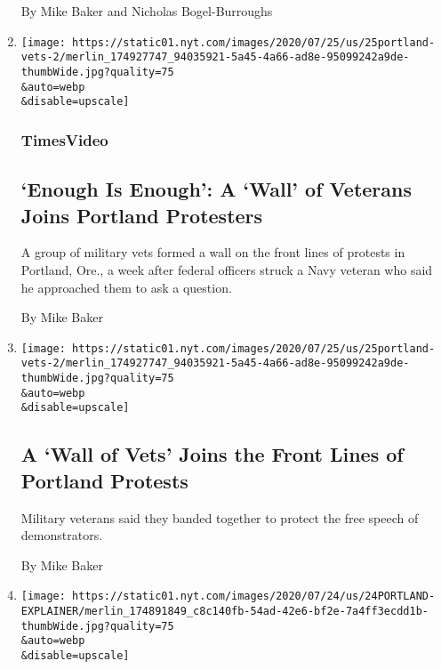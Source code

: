 \begin{enumerate}
  By Mike Baker and Nicholas Bogel-Burroughs
\item
  \href{/video/us/politics/100000007256689/portland-protest-wall-of-vets.html}{}

  \texttt{[image: https://static01.nyt.com/images/2020/07/25/us/25portland-vets-2/merlin\_174927747\_94035921-5a45-4a66-ad8e-95099242a9de-thumbWide.jpg?quality=75\\\&auto=webp\\\&disable=upscale]}

  \hypertarget{timesvideo}{%
  \subsubsection{TimesVideo}\label{timesvideo}}

  \hypertarget{enough-is-enough-a-wall-of-veterans-joins-portland-protesters}{%
  \subsection{`Enough Is Enough': A `Wall' of Veterans Joins Portland
  Protesters}\label{enough-is-enough-a-wall-of-veterans-joins-portland-protesters}}

  A group of military vets formed a wall on the front lines of protests
  in Portland, Ore., a week after federal officers struck a Navy veteran
  who said he approached them to ask a question.

  By Mike Baker
\item
  \href{/2020/07/25/us/a-wall-of-vets-joins-the-front-lines-of-portland-protests.html}{}

  \texttt{[image: https://static01.nyt.com/images/2020/07/25/us/25portland-vets-2/merlin\_174927747\_94035921-5a45-4a66-ad8e-95099242a9de-thumbWide.jpg?quality=75\\\&auto=webp\\\&disable=upscale]}

  \hypertarget{a-wall-of-vets-joins-the-front-lines-of-portland-protests}{%
  \subsection{A `Wall of Vets' Joins the Front Lines of Portland
  Protests}\label{a-wall-of-vets-joins-the-front-lines-of-portland-protests}}

  Military veterans said they banded together to protect the free speech
  of demonstrators.

  By Mike Baker
\item
  \href{/article/portland-protests-explained-protesters.html}{}

  \texttt{[image: https://static01.nyt.com/images/2020/07/24/us/24PORTLAND-EXPLAINER/merlin\_174891849\_c8c140fb-54ad-42e6-bf2e-7a4ff3ecdd1b-thumbWide.jpg?quality=75\\\&auto=webp\\\&disable=upscale]}


\end{enumerate}
